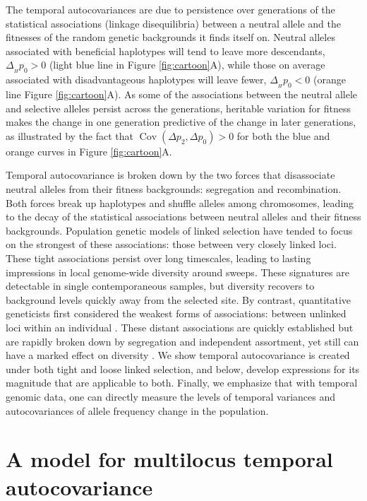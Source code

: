 \documentclass[11pt]{article}
\DeclareMathOperator{\cov}{Cov}
\begin{document}
The temporal autocovariances are due to persistence over generations of the
statistical associations (linkage disequilibria) between a neutral allele and
the fitnesses of the random genetic backgrounds it finds itself on. Neutral
alleles associated with beneficial haplotypes will tend to leave more
descendants, $\Delta_{_H} p_0 > 0$ (light blue line in Figure
\ref{fig:cartoon}A), while those on average associated with disadvantageous
haplotypes will leave fewer, $\Delta_{_H} p_0 < 0$ (orange line Figure
\ref{fig:cartoon}A). As some of the associations between the neutral allele and
selective alleles persist across the generations, heritable variation for
fitness makes the change in one generation predictive of the change in later
generations, as illustrated by the fact that $\cov(\Delta p_2, \Delta p_0) > 0$
for both the blue and orange curves in Figure \ref{fig:cartoon}A.

Temporal autocovariance is broken down by the two forces that disassociate
neutral alleles from their fitness backgrounds: segregation and recombination.
Both forces break up haplotypes and shuffle alleles among chromosomes, leading
to the decay of the statistical associations between neutral alleles and their
fitness backgrounds. Population genetic models of linked selection have tended
to focus on the strongest of these associations: those between very closely
linked loci. These tight associations persist over long timescales, leading to
lasting impressions in local genome-wide diversity around sweeps. These
signatures are detectable in single contemporaneous samples, but diversity
recovers to background levels quickly away from the selected site. By contrast,
quantitative geneticists first considered the weakest forms of associations:
between unlinked loci within an individual \parencite{Morley1954-yp,
Robertson1961-ho, Santiago1995-hx}. These distant associations are quickly
established but are rapidly broken down by segregation and independent
assortment, yet still can have a marked effect on diversity
\parencite{Robertson1961-ho,Santiago1995-hx}. We show temporal autocovariance
is created under both tight and loose linked selection, and below, develop
expressions for its magnitude that are applicable to both. Finally, we
emphasize that with temporal genomic data, one can directly measure the levels
of temporal variances and autocovariances of allele frequency change in the
population.

\section{A model for multilocus temporal autocovariance}
\end{document}
